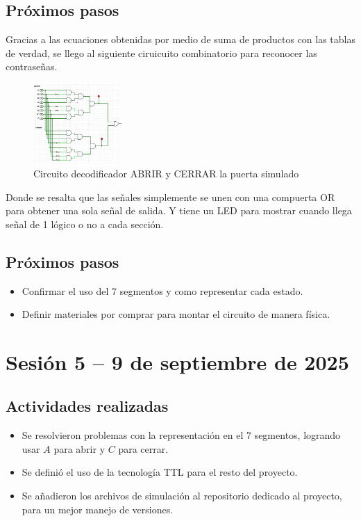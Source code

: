 \documentclass[12pt,letterpaper]{article}
\begin{document}
\subsection*{Próximos pasos}
Gracias a las ecuaciones obtenidas por medio de suma de productos con las tablas de verdad, se llego al siguiente ciruicuito combinatorio para reconocer las contraseñas.
\begin{figure}[H]
    \centering
    \includegraphics[width=0.3\textwidth]{images/sim_decodifcador.png} %
    \caption{Circuito decodificador ABRIR y CERRAR la puerta simulado}
    \label{fig:sensores}
\end{figure}
Donde se resalta que las señales simplemente se unen con una compuerta OR para obtener una sola señal de salida. Y tiene un LED para mostrar cuando llega señal de 1 lógico o no a cada sección.

\subsection*{Próximos pasos}
\begin{itemize}
    \item Confirmar el uso del 7 segmentos y como representar cada estado.
    \item Definir materiales por comprar para montar el circuito de manera física.
\end{itemize}

\section{Sesión 5 -- 9 de septiembre de 2025}
\subsection*{Actividades realizadas}
\begin{itemize}
    \item Se resolvieron problemas con la representación en el 7 segmentos, logrando usar $A$ para abrir y $C$ para cerrar.
    \item Se definió el uso de la tecnología TTL para el resto del proyecto.
    \item Se añadieron los archivos de simulación al repositorio dedicado al proyecto, para un mejor manejo de versiones.
\end{itemize}
\end{document}
